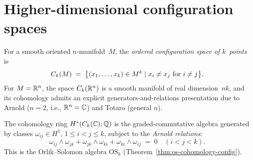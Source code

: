 \label{rem:en-koszul-hms}%


\section{Higher-dimensional configuration spaces}
\label{sec:higher-dim-config}

\begin{definition}
\label{def:config-rn}
For a smooth oriented $n$-manifold~$M$, the \emph{ordered
configuration space of $k$~points} is
\[
C_k(M) \;=\;
\bigl\{(x_1, \ldots, x_k) \in M^k
  \mid x_i \neq x_j \text{ for } i \neq j\bigr\}.
\]
For $M = \mathbb{R}^n$, the space $C_k(\mathbb{R}^n)$ is a smooth manifold
of real dimension~$nk$, and its cohomology admits an explicit
generators-and-relations presentation due to Arnold ($n = 2$, i.e., $\mathbb{R}^n = \mathbb{C}$) and
Totaro (general $n$).
\end{definition}

\begin{theorem}[Arnold presentation {\cite{Arnold69}}; \texorpdfstring{$\bC \cong \bR^2$}{C = R2};
\ClaimStatusProvedElsewhere]
\label{thm:arnold-presentation}
The cohomology ring $H^*(C_k(\mathbb{C}); \mathbb{Q})$ is the graded-commutative
algebra generated by classes $\omega_{ij} \in H^1$,
$1 \leq i < j \leq k$, subject to the \emph{Arnold relations}:
\begin{equation}\label{eq:arnold-rel-en}
\omega_{ij} \wedge \omega_{jk}
+ \omega_{jk} \wedge \omega_{ki}
+ \omega_{ki} \wedge \omega_{ij} \;=\; 0
\quad (i < j < k).
\end{equation}
This is the Orlik--Solomon algebra $\mathrm{OS}_k$
\textup{(}Theorem~\textup{\ref{thm:os-cohomology-config})}.
\end{theorem}

